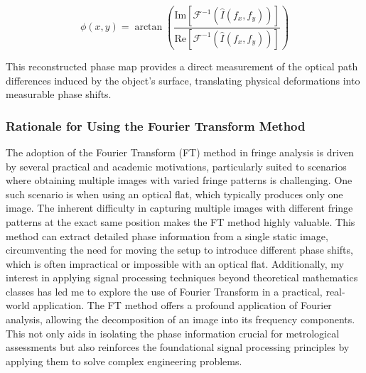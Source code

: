 \documentclass[../main.tex]{subfiles}
\begin{document}
\begin{minipage}{\textwidth}
\begin{equation}
    \phi(x, y) = \arctan\left(\frac{\text{Im}[\mathcal{F}^{-1}(\hat{I}(f_x, f_y))]}{\text{Re}[\mathcal{F}^{-1}(\hat{I}(f_x, f_y))]}\right)
\end{equation}

This reconstructed phase map provides a direct measurement of the optical path differences induced by the object's surface, translating physical deformations into measurable phase shifts.

\subsubsection{Rationale for Using the Fourier Transform Method}
The adoption of the Fourier Transform (FT) method in fringe analysis is driven by several practical and academic motivations, particularly suited to scenarios where obtaining multiple images with varied fringe patterns is challenging. One such scenario is when using an optical flat, which typically produces only one image. The inherent difficulty in capturing multiple images with different fringe patterns at the exact same position makes the FT method highly valuable. This method can extract detailed phase information from a single static image, circumventing the need for moving the setup to introduce different phase shifts, which is often impractical or impossible with an optical flat.
\newline
Additionally, my interest in applying signal processing techniques beyond theoretical mathematics classes has led me to explore the use of Fourier Transform in a practical, real-world application. The FT method offers a profound application of Fourier analysis, allowing the decomposition of an image into its frequency components. This not only aids in isolating the phase information crucial for metrological assessments but also reinforces the foundational signal processing principles by applying them to solve complex engineering problems.
\vspace{8pt}
\end{minipage}
\end{document}
